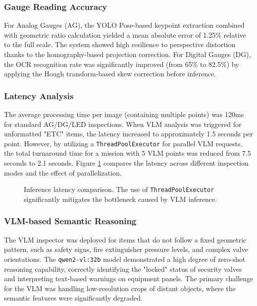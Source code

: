 \subsubsection{Gauge Reading Accuracy}
For Analog Gauges (AG), the YOLO Pose-based keypoint extraction combined with geometric ratio calculation yielded a mean absolute error of 1.25\% relative to the full scale. The system showed high resilience to perspective distortion thanks to the homography-based projection correction. For Digital Gauges (DG), the OCR recognition rate was significantly improved (from 65\% to 82.5\%) by applying the Hough transform-based skew correction before inference.

\subsubsection{Latency Analysis}
The average processing time per image (containing multiple points) was 120ms for standard AG/DG/LED inspections. When VLM analysis was triggered for unformatted "ETC" items, the latency increased to approximately 1.5 seconds per point. However, by utilizing a \texttt{ThreadPoolExecutor} for parallel VLM requests, the total turnaround time for a mission with 5 VLM points was reduced from 7.5 seconds to 2.1 seconds. Figure \ref{fig:latency_analysis} compares the latency across different inspection modes and the effect of parallelization.

\begin{figure}[h]
\centering
\fbox{\rule{0pt}{1.5in} \rule{0.8\linewidth}{0pt}} %
\caption{Inference latency comparison. The use of \texttt{ThreadPoolExecutor} significantly mitigates the bottleneck caused by VLM inference.}
\label{fig:latency_analysis}
\end{figure}

\subsubsection{VLM-based Semantic Reasoning}
The VLM inspector was deployed for items that do not follow a fixed geometric pattern, such as safety signs, fire extinguisher pressure levels, and complex valve orientations. The \texttt{qwen2-vl:32b} model demonstrated a high degree of zero-shot reasoning capability, correctly identifying the "locked" status of security valves and interpreting text-based warnings on equipment panels. The primary challenge for the VLM was handling low-resolution crops of distant objects, where the semantic features were significantly degraded.

